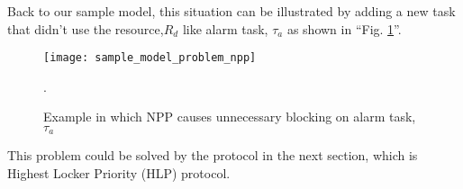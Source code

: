 Back to our sample model, this situation can be illustrated by adding a new task that didn't use the resource,$ R_{d}$ like alarm task, $\tau_{a}$ as shown in ``Fig. \ref{fig:sample_model_problem_npp}''.

 
\begin{figure}[ht]
    \centering
    \texttt{[image: sample\_model\_problem\_npp]}
    \caption{Example in which NPP causes unnecessary blocking on alarm task, $ \tau_{a} $ }.
    \label{fig:sample_model_problem_npp}
\end{figure}

 This problem could be solved by the protocol in the next section, which is Highest Locker Priority (HLP) protocol.